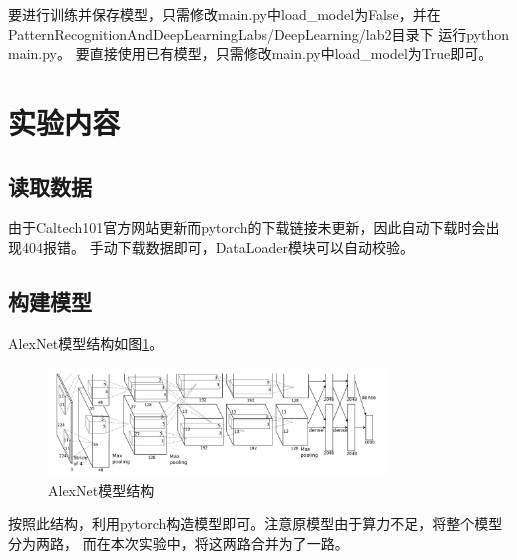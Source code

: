 \documentclass{article}
\begin{document}
要进行训练并保存模型，只需修改main.py中load\_model为False，并在
PatternRecognitionAndDeepLearningLabs/DeepLearning/lab2目录下
运行python main.py。
要直接使用已有模型，只需修改main.py中load\_model为True即可。

\section{实验内容}

\subsection{读取数据}

由于Caltech101官方网站更新而pytorch的下载链接未更新，因此自动下载时会出现404报错。
手动下载数据即可，DataLoader模块可以自动校验。

\subsection{构建模型}

AlexNet模型结构如图\ref{alexnet}。

\begin{figure}[H]
    \centering
    \includegraphics[width=0.8\textwidth]{figures/alexnet.png}
    \caption{AlexNet模型结构}
    \label{alexnet}
\end{figure}

按照此结构，利用pytorch构造模型即可。注意原模型由于算力不足，将整个模型分为两路，
而在本次实验中，将这两路合并为了一路。
\end{document}
